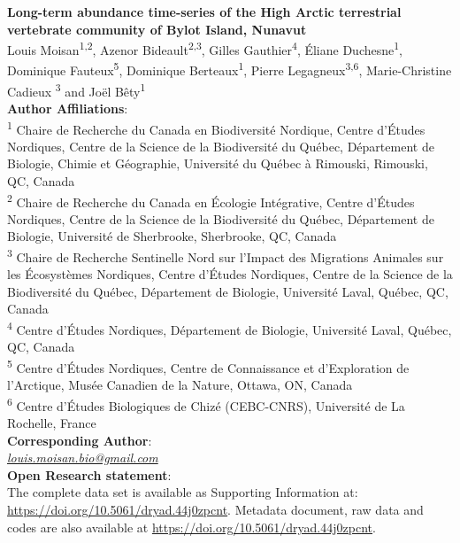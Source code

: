 \documentclass[a4paper,twoside,12pt]{article}
\begin{document}
 
\begingroup  
  \centering
\textbf{Long-term abundance time-series of the High Arctic terrestrial vertebrate community of Bylot Island, Nunavut}\\[1.5em]
 Louis Moisan\textsuperscript{1,2}, Azenor Bideault\textsuperscript{2,3}, Gilles Gauthier\textsuperscript{4}, Éliane Duchesne\textsuperscript{1}, 
 Dominique Fauteux\textsuperscript{5}, Dominique Berteaux\textsuperscript{1}, Pierre Legagneux\textsuperscript{3,6}, Marie-Christine Cadieux \textsuperscript{3} and Joël Bêty\textsuperscript{1}\\[1.5em]
\textbf{Author Affiliations}:\\
\textsuperscript{1} Chaire de Recherche du Canada en Biodiversité Nordique, Centre d’Études Nordiques, Centre de la Science de la Biodiversité du Québec, Département de Biologie, Chimie et Géographie, Université du Québec à Rimouski, Rimouski, QC, Canada\\
\textsuperscript{2} Chaire de Recherche du Canada en Écologie Intégrative, Centre d’Études Nordiques, Centre de la Science de la Biodiversité du Québec, Département de Biologie, Université de Sherbrooke, Sherbrooke, QC, Canada\\
\textsuperscript{3} Chaire de Recherche Sentinelle Nord sur l’Impact des Migrations Animales sur les Écosystèmes Nordiques, Centre d’Études Nordiques, Centre de la Science de la Biodiversité du Québec, Département de Biologie, Université Laval, Québec, QC, Canada\\
\textsuperscript{4} Centre d’Études Nordiques, Département de Biologie, Université Laval, Québec, QC, Canada\\
\textsuperscript{5} Centre d’Études Nordiques, Centre de Connaissance et d’Exploration de l’Arctique, Musée Canadien de la Nature, Ottawa, ON, Canada\\
\textsuperscript{6} Centre d’Études Biologiques de Chizé (CEBC-CNRS), Université de La Rochelle, France 
\\[1.5em]
\textbf{Corresponding Author}:\\
\textit{\href{mailto:louis.moisan.bio@gmail.com}{louis.moisan.bio@gmail.com}}\\
[1.5em]
\textbf{Open Research statement}:\\
The complete data set is available as Supporting Information at: \url{https://doi.org/10.5061/dryad.44j0zpcnt}. Metadata document, raw data and codes are also available at \url{https://doi.org/10.5061/dryad.44j0zpcnt}.\\
\endgroup
\newpage
\end{document}
